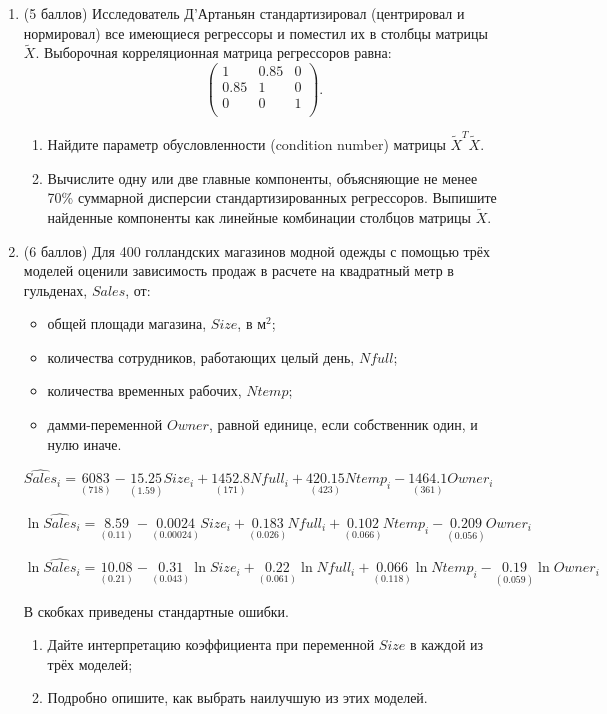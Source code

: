 \documentclass[12pt]{article}
\theoremstyle{definition}
\begin{document}
\begin{enumerate}
\item
(5 баллов)
Исследователь Д'Артаньян стандартизировал (центрировал и нормировал) все имеющиеся регрессоры и поместил их в столбцы матрицы $\tilde X$. Выборочная корреляционная матрица регрессоров равна:
\[
\begin{pmatrix}
1 & 0.85 & 0  \\
0.85 & 1 & 0  \\
0 & 0 & 1 \\
\end{pmatrix}.
\]
\begin{enumerate}
    \item Найдите параметр обусловленности (condition number) матрицы  $\tilde X^T \tilde X$.
    \item Вычислите одну или две главные компоненты, объясняющие не менее 70\% суммарной дисперсии стандартизированных регрессоров. Выпишите найденные компоненты как линейные комбинации столбцов матрицы $\tilde X$.
\end{enumerate}
\newpage

\item
(6 баллов)
Для 400 голландских магазинов модной одежды с помощью трёх моделей оценили зависимость продаж в расчете на квадратный метр в гульденах, $Sales$, от:
\begin{itemize}
\item общей площади магазина, $Size$, в м$^2$;
\item количества сотрудников, работающих целый день, $Nfull$;
\item количества временных рабочих, $Ntemp$;
\item дамми-переменной $Owner$, равной единице, если собственник один, и нулю иначе.
\end{itemize}

$\widehat{Sales}_i = \underset{(718)}{6083} - \underset{(1.59)}{15.25}Size_i + \underset{(171)}{1452.8} Nfull_i + \underset{(423)}{420.15} Ntemp_i - \underset{(361)}{1464.1} Owner_i$

$\ln \widehat{Sales}_i = \underset{(0.11)}{8.59} - \underset{(0.00024)}{0.0024}Size_i + \underset{(0.026)}{0.183} Nfull_i + \underset{(0.066)}{0.102} Ntemp_i - \underset{(0.056)}{0.209} Owner_i$

$\ln \widehat{Sales}_i = \underset{(0.21)}{10.08} - \underset{(0.043)}{0.31}\ln Size_i + \underset{(0.061)}{0.22} \ln Nfull_i + \underset{(0.118)}{0.066} \ln Ntemp_i - \underset{(0.059)}{0.19} \ln Owner_i$

В скобках приведены стандартные ошибки.

\begin{enumerate}
    \item Дайте интерпретацию коэффициента при переменной $Size$ в каждой из трёх моделей;
    \item Подробно опишите, как выбрать наилучшую из этих моделей.
\end{enumerate}

\end{enumerate}
\end{document}
